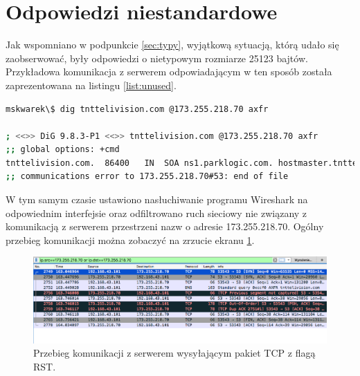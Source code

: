 \section{Odpowiedzi niestandardowe}
\noindent Jak wspomniano w podpunkcie \ref{sec:typy}, wyjątkową sytuacją, którą udało się zaobserwować, były odpowiedzi o nietypowym
rozmiarze 25123 bajtów. Przykładowa komunikacja z serwerem odpowiadającym w ten sposób została zaprezentowana na listingu
\ref{list:unused}.

\begin{lstlisting}[label={list:unused},captionpos=b,caption=Przykładowy odpowiedź serwera.,language=bash]
mskwarek\$ dig tnttelivision.com @173.255.218.70 axfr

; <<>> DiG 9.8.3-P1 <<>> tnttelivision.com @173.255.218.70 axfr
;; global options: +cmd
tnttelivision.com.	86400	IN	SOA	ns1.parklogic.com. hostmaster.tnttelivision.com. 2017061500 16384 2048 1048576 2560
;; communications error to 173.255.218.70#53: end of file
\end{lstlisting}

W tym samym czasie ustawiono nasłuchiwanie programu Wireshark \cite{wireshark} na odpowiednim interfejsie oraz odfiltrowano ruch sieciowy
nie związany z komunikacją z serwerem przestrzeni nazw o adresie 173.255.218.70. Ogólny przebieg komunikacji można zobaczyć na
zrzucie ekranu \ref{fig:unused_wireshark}.
\begin{figure}[h!]
\centering
\includegraphics[width=1.0\textwidth]{image/unused_wireshark}
	\caption{Przebieg komunikacji z serwerem wysyłającym pakiet TCP z flagą RST.}
\label{fig:unused_wireshark}
\end{figure}

